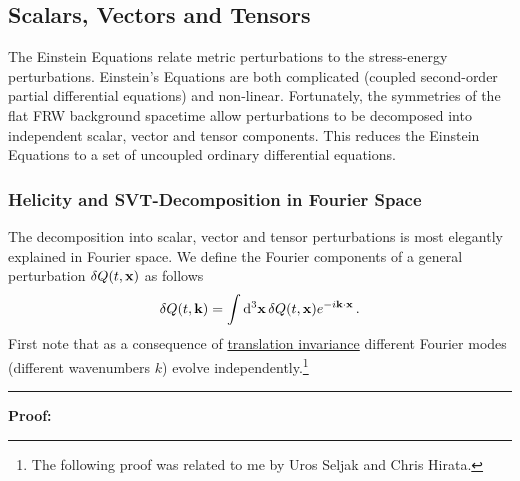 \documentclass[12pt,letterpaper,rotate]{article}
\def\beq{\begin{equation}}
\def\eeq{\end{equation}}
\def\d{{\rm d}}
\begin{document}
{\subsection{Scalars, Vectors and Tensors}

The
Einstein Equations  relate metric perturbations to the stress-energy perturbations.
Einstein's Equations are both complicated (coupled second-order partial differential equations) and non-linear.
Fortunately, the symmetries of the flat FRW background spacetime allow perturbations to be decomposed into independent scalar, vector and tensor components.
This reduces the Einstein Equations to a set of uncoupled ordinary differential equations.


\subsubsection{Helicity and SVT-Decomposition in Fourier Space}

The decomposition into scalar, vector and tensor perturbations is most elegantly explained in Fourier space.
We define the Fourier components of a general perturbation $\delta Q(t,{\bf x})$ as follows
\beq
\delta Q(t, {\bf k}) = \int \d^3 {\bf x} \, \delta Q(t,{\bf x}) e^{-i {\bf k} \cdot {\bf x}}\, . 
\eeq
First note that as a consequence of \underline{translation invariance} different Fourier modes (different wavenumbers $k$) evolve independently.\footnote{The following proof was related to me by Uros Seljak and Chris Hirata.}

\vspace{0.5cm}
 \hrule \vspace{0.3cm}
{\bf Proof:}

}
\end{document}
